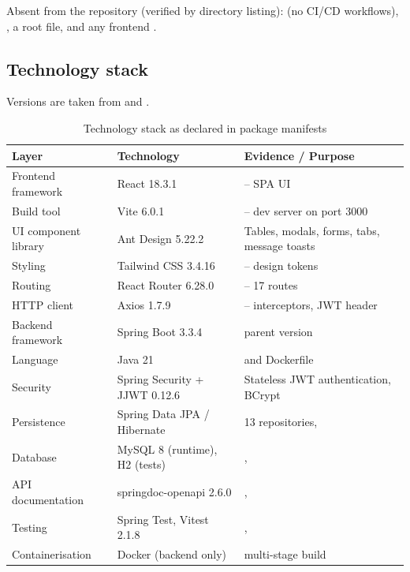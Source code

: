 \noindent Absent from the repository (verified by directory listing):  (no CI/CD workflows), , a root  file, and any frontend . 

\subsection{Technology stack}

Versions are taken from  and .

\begin{table}[H]
\centering
\caption{Technology stack as declared in package manifests}
\label{tab:tech-stack}
\begin{tabular}{@{}L{3.2cm}L{4.6cm}L{6.4cm}@{}}
\toprule
\textbf{Layer} & \textbf{Technology} & \textbf{Evidence / Purpose} \\
\midrule
Frontend framework & React 18.3.1 &  -- SPA UI \\
Build tool & Vite 6.0.1 &  -- dev server on port 3000 \\
UI component library & Ant Design 5.22.2 & Tables, modals, forms, tabs, message toasts \\
Styling & Tailwind CSS 3.4.16 &  -- design tokens \\
Routing & React Router 6.28.0 &  -- 17 routes \\
HTTP client & Axios 1.7.9 &  -- interceptors, JWT header \\
Backend framework & Spring Boot 3.3.4 &  parent version \\
Language & Java 21 &   and Dockerfile \\
Security & Spring Security + JJWT 0.12.6 & Stateless JWT authentication, BCrypt \\
Persistence & Spring Data JPA / Hibernate & 13 repositories,  \\
Database & MySQL 8 (runtime), H2 (tests) & ,  \\
API documentation & springdoc-openapi 2.6.0 & ,  \\
Testing & Spring Test, Vitest 2.1.8 & ,  \\
Containerisation & Docker (backend only) &  multi-stage build \\
\bottomrule
\end{tabular}
\end{table}

